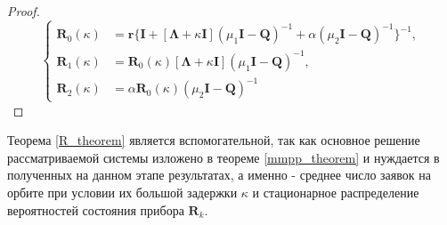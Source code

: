 \begin{proof}
\begin{equation*}
	\left\{
	\begin{aligned}
		\boldsymbol{R}_{0}(\kappa) & = \boldsymbol{r}\{\boldsymbol{I} + [\boldsymbol{\Lambda} + \kappa\boldsymbol{I}](\mu_{1}\boldsymbol{I}-\boldsymbol{Q})^{-1}+\alpha(\mu_{2}\boldsymbol{I}-\boldsymbol{Q})^{-1}\}^{-1},\\
		\boldsymbol{R}_{1}(\kappa) & = \boldsymbol{R}_{0}(\kappa)[\boldsymbol{\Lambda} + \kappa\boldsymbol{I}](\mu_{1}\boldsymbol{I} - \boldsymbol{Q})^{-1},\\
		\boldsymbol{R}_{2}(\kappa) & = \alpha\boldsymbol{R}_{0}(\kappa)(\mu_{2}\boldsymbol{I} - \boldsymbol{Q})^{-1}
	\end{aligned}
	\right.
\end{equation*}
\end{proof}
Теорема \ref{R_theorem} является вспомогательной, так как основное решение рассматриваемой системы изложено в теореме \ref{mmpp_theorem} и нуждается в полученных на данном этапе результатах, а именно - среднее число заявок на орбите при условии их большой задержки $\kappa$ и стационарное распределение вероятностей состояния прибора $\boldsymbol{R}_{k}$.

